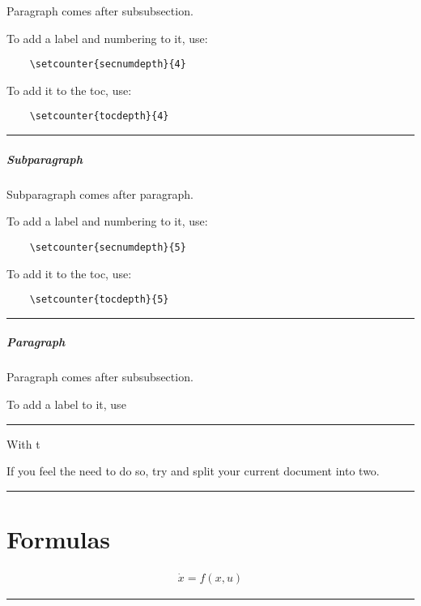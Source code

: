 \documentclass[12pt]{article}
\newcommand{\inOut}[1]{#1} %
\begin{document}
\begin{remark} \label{rem-paragraph}
  Paragraph comes after subsubsection.
  
  To add a label and numbering to it, use:

  \begin{lstlisting}
    \setcounter{secnumdepth}{4}
  \end{lstlisting}
  
  To add it to the toc, use:
  
  \begin{lstlisting}
    \setcounter{tocdepth}{4}
  \end{lstlisting}
  
\end{remark}\hrule
  
\subparagraph{Subparagraph}

\begin{remark} \label{rem-subparagraph}
  Subparagraph comes after paragraph.
  
  To add a label and numbering to it, use:

  \begin{lstlisting}
    \setcounter{secnumdepth}{5}
  \end{lstlisting}
  
  To add it to the toc, use:
  
  \begin{lstlisting}
    \setcounter{tocdepth}{5}
  \end{lstlisting}
  
\end{remark}\hrule

\subparagraph{Paragraph}

\begin{remark} \label{paragraph}
  Paragraph comes after subsubsection.
  
  To add a label to it, use \setcounter{secnumdepth}{4}
\end{remark}\hrule

\begin{remark} \label{remSec1}
  With t
  
  If you feel the need to do so, try and split your current document into two.
\end{remark}\hrule

\section{Formulas}\label{secForm}

\begin{example} \label{expFor2}
  \inOut{
    \begin{equation}\begin{aligned}\label{eqFor2}
      \dot{x} = f(x,u)
    \end{aligned}\end{equation}
  }
\end{example}\hrule
\end{document}
